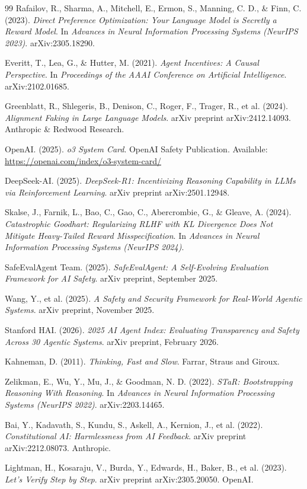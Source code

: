 \documentclass[11pt,a4paper]{article}
\begin{document}
\begin{thebibliography}{99}
Rafailov, R., Sharma, A., Mitchell, E., Ermon, S., Manning, C. D., \& Finn, C. (2023). \textit{Direct Preference Optimization: Your Language Model is Secretly a Reward Model}. In \textit{Advances in Neural Information Processing Systems (NeurIPS 2023)}. arXiv:2305.18290.

Everitt, T., Lea, G., \& Hutter, M. (2021). \textit{Agent Incentives: A Causal Perspective}. In \textit{Proceedings of the AAAI Conference on Artificial Intelligence}. arXiv:2102.01685.

Greenblatt, R., Shlegeris, B., Denison, C., Roger, F., Trager, R., et al. (2024). \textit{Alignment Faking in Large Language Models}. arXiv preprint arXiv:2412.14093. Anthropic \& Redwood Research.

OpenAI. (2025). \textit{o3 System Card}. OpenAI Safety Publication. Available: \url{https://openai.com/index/o3-system-card/}

DeepSeek-AI. (2025). \textit{DeepSeek-R1: Incentivizing Reasoning Capability in LLMs via Reinforcement Learning}. arXiv preprint arXiv:2501.12948.

Skalse, J., Farnik, L., Bao, C., Gao, C., Abercrombie, G., \& Gleave, A. (2024). \textit{Catastrophic Goodhart: Regularizing RLHF with KL Divergence Does Not Mitigate Heavy-Tailed Reward Misspecification}. In \textit{Advances in Neural Information Processing Systems (NeurIPS 2024)}.

SafeEvalAgent Team. (2025). \textit{SafeEvalAgent: A Self-Evolving Evaluation Framework for AI Safety}. arXiv preprint, September 2025.

Wang, Y., et al. (2025). \textit{A Safety and Security Framework for Real-World Agentic Systems}. arXiv preprint, November 2025.

Stanford HAI. (2026). \textit{2025 AI Agent Index: Evaluating Transparency and Safety Across 30 Agentic Systems}. arXiv preprint, February 2026.

Kahneman, D. (2011). \textit{Thinking, Fast and Slow}. Farrar, Straus and Giroux.

Zelikman, E., Wu, Y., Mu, J., \& Goodman, N. D. (2022). \textit{STaR: Bootstrapping Reasoning With Reasoning}. In \textit{Advances in Neural Information Processing Systems (NeurIPS 2022)}. arXiv:2203.14465.

Bai, Y., Kadavath, S., Kundu, S., Askell, A., Kernion, J., et al. (2022). \textit{Constitutional AI: Harmlessness from AI Feedback}. arXiv preprint arXiv:2212.08073. Anthropic.

Lightman, H., Kosaraju, V., Burda, Y., Edwards, H., Baker, B., et al. (2023). \textit{Let's Verify Step by Step}. arXiv preprint arXiv:2305.20050. OpenAI.

\end{thebibliography}
\end{document}

